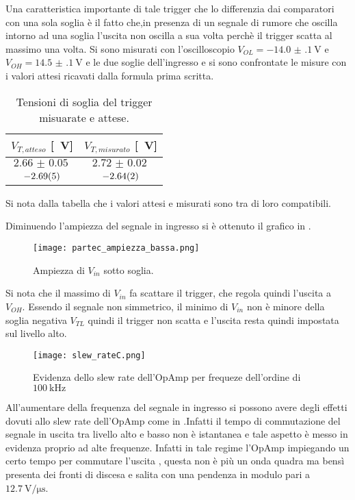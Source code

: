 Una caratteristica importante di tale trigger che lo differenzia dai comparatori con una sola soglia è il fatto che,in presenza di un segnale di rumore che oscilla intorno ad una soglia l'uscita non oscilla a sua volta perchè il trigger scatta al massimo una volta.
Si sono misurati con l'oscilloscopio $V_{OL}= \SI{-14.0(1)}{\V}$ e  $V_{OH}= \SI{14.5(1)}{\V}$ e le due soglie dell'ingresso e si sono confrontate le misure con i valori attesi ricavati dalla formula prima scritta.
\begin{table}[h]
	\centering
	\begin{tabular}{ *{2}{S[table-figures-exponent = 2]} } 
		{$V_{T,atteso}$ [\SI{}{\V}]} & {$V_{T,misurato}$ [\SI{}{\V}]} \\
		\midrule 
		 $\SI{2.66(5)}{}$	&	$\SI{2.72(2)}{}$	\\ 
		$\SI{-2.69 (5)}{}$	&	$\SI{-2.64 (2)}{}$	\\ 
	\end{tabular} 
	\caption{Tensioni di soglia del trigger misuarate e attese.} 
	\label{t:trigg_soglia} 
\end{table}
Si nota dalla tabella che i valori attesi e misurati sono tra di loro compatibili.

Diminuendo l'ampiezza del segnale in ingresso si è ottenuto il grafico in .
\begin{figure}[h]
	\centering
	\texttt{[image: partec\_ampiezza\_bassa.png]}
	\caption{Ampiezza di $V_{in}$ sotto soglia. }
	\label{f:sotto_soglia}
\end{figure}

Si nota che il massimo di $V_{in}$ fa scattare il trigger, che regola quindi l'uscita a $V_{OH}$. Essendo il segnale non simmetrico, il minimo di $V_{in}$ non è minore della soglia negativa $V_{TL}$ quindi il trigger non scatta e l'uscita resta quindi impostata sul livello alto.

\begin{figure}[h]
	\centering
	\texttt{[image: slew\_rateC.png]}
	\caption{Evidenza dello slew rate dell'OpAmp per frequeze dell'ordine di $\SI{100}{\kHz}$}
	\label{f:slew_rate}
\end{figure}

All'aumentare della frequenza del segnale in ingresso si possono avere degli effetti dovuti allo slew rate dell'OpAmp come in .Infatti il tempo di commutazione del segnale in uscita tra livello alto e basso non è istantanea e tale aspetto è messo in evidenza proprio ad alte frequenze. Infatti in tale regime l'OpAmp impiegando un certo tempo per commutare l'uscita , questa non è più un onda quadra ma bensì presenta dei fronti di discesa e salita con una pendenza in modulo pari a $\SI{12.7}{\volt\per\micro\s}$.


